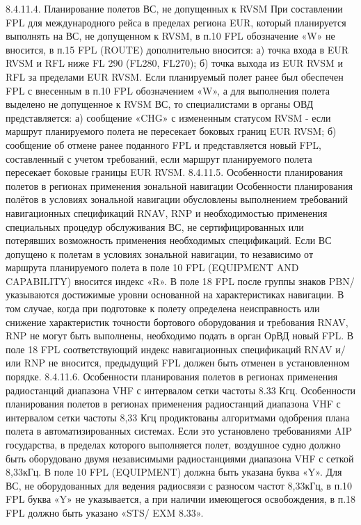 8.4.11.4. Планирование полетов ВС, не допущенных к RVSM
При составлении FPL для международного рейса в пределах региона EUR, который планируется выполнять на ВС, не допущенном к RVSM, в п.10 FPL обозначение «W» не вносится, в п.15 FPL (ROUTE) дополнительно вносится: 
а)	точка входа в EUR RVSM и RFL ниже FL 290 (FL280, FL270);
б)	точка выхода из EUR RVSM и RFL за пределами EUR RVSM.
Если планируемый полет ранее был обеспечен FPL с внесенным в п.10 FPL обозначением «W», а для выполнения полета выделено не допущенное к RVSM ВС, то специалистами в органы ОВД представляется: 
а)	сообщение «CHG» с измененным статусом RVSM - если маршрут планируемого полета не пересекает боковых границ EUR RVSM; 
б)	сообщение об отмене ранее поданного FPL и представляется новый FPL, составленный с учетом требований, если маршрут планируемого полета пересекает боковые границы EUR RVSM. 
8.4.11.5. Особенности планирования полетов в регионах применения зональной навигации
Особенности планирования полётов в условиях зональной навигации обусловлены выполнением требований навигационных спецификаций RNAV, RNP и необходимостью применения специальных процедур обслуживания ВС, не сертифицированных или потерявших возможность применения необходимых спецификаций.
Если ВС допущено к полетам в условиях зональной навигации, то независимо от маршрута планируемого полета в поле 10 FPL (EQUIPMENT AND CAPABILITY) вносится индекс «R». В поле 18 FPL после группы знаков PBN/ указываются достижимые уровни основанной на характеристиках навигации.
В том случае, когда при подготовке к полету определена неисправность или снижение характеристик точности бортового оборудования и требования RNAV, RNP не могут быть выполнены, необходимо подать в орган ОрВД новый FPL. В поле 18 FPL соответствующий индекс навигационных спецификаций RNAV и/или RNP не вносится, предыдущий FPL должен быть отменен в установленном порядке.
8.4.11.6. Особенности планирования полетов в регионах применения радиостанций диапазона VHF с интервалом сетки частоты 8.33 Кгц.
Особенности планирования полетов в регионах применения радиостанций диапазона VHF с интервалом 
сетки частоты 8,33 Кгц продиктованы алгоритмами одобрения плана полета в автоматизированных системах. 
Если это установлено требованиями AIP государства, в пределах которого выполняется полет, воздушное судно должно быть оборудовано двумя независимыми радиостанциями диапазона VHF с сеткой 8,33кГц. В поле 10 FPL (EQUIPMENT) должна быть указана буква «Y». 
Для ВС, не оборудованных для ведения радиосвязи с разносом частот 8,33кГц, в п.10 FPL буква «Y» не указывается, а при наличии имеющегося освобождения, в п.18 FPL должно быть указано «STS/ EXM 8.33». 
